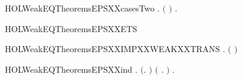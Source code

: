 \newcommand{\HOLWeakEQTheoremsEPSXXcasesOne}{\UseVerbatim{HOLWeakEQTheoremsEPSXXcasesOne}}
\begin{SaveVerbatim}{HOLWeakEQTheoremsEPSXXcasesTwo}
\HOLTokenTurnstile{} \HOLSymConst{\HOLTokenForall{}} .    \HOLSymConst{\HOLTokenEquiv{}} \ensuremath{(} \HOLSymConst{\ensuremath{=}} \ensuremath{)} \HOLSymConst{\HOLTokenDisj{}} \HOLSymConst{\HOLTokenExists{}}.    \HOLSymConst{\HOLTokenConj{}}  \HOLTokenTransBegin\HOLConst{\ensuremath{\tau}}\HOLTokenTransEnd {}
\end{SaveVerbatim}
\newcommand{\HOLWeakEQTheoremsEPSXXcasesTwo}{\UseVerbatim{HOLWeakEQTheoremsEPSXXcasesTwo}}
\begin{SaveVerbatim}{HOLWeakEQTheoremsEPSXXETS}
\HOLTokenTurnstile{}  \HOLSymConst{\ensuremath{=}}   \HOLConst{\ensuremath{\tau}}
\end{SaveVerbatim}
\newcommand{\HOLWeakEQTheoremsEPSXXETS}{\UseVerbatim{HOLWeakEQTheoremsEPSXXETS}}
\begin{SaveVerbatim}{HOLWeakEQTheoremsEPSXXIMPXXWEAKXXTRANS}
\HOLTokenTurnstile{} \HOLSymConst{\HOLTokenForall{}} .    \HOLSymConst{\HOLTokenImp{}} \ensuremath{(} \HOLSymConst{\ensuremath{=}} \ensuremath{)} \HOLSymConst{\HOLTokenDisj{}}  \HOLTokenWeakTransBegin\HOLConst{\ensuremath{\tau}}\HOLTokenWeakTransEnd {}
\end{SaveVerbatim}
\newcommand{\HOLWeakEQTheoremsEPSXXIMPXXWEAKXXTRANS}{\UseVerbatim{HOLWeakEQTheoremsEPSXXIMPXXWEAKXXTRANS}}
\begin{SaveVerbatim}{HOLWeakEQTheoremsEPSXXind}
\HOLTokenTurnstile{} \HOLSymConst{\HOLTokenForall{}}.
       \ensuremath{(}\HOLSymConst{\HOLTokenForall{}}.   \ensuremath{)} \HOLSymConst{\HOLTokenConj{}} \ensuremath{(}\HOLSymConst{\HOLTokenForall{}}  .  \HOLTokenTransBegin\HOLConst{\ensuremath{\tau}}\HOLTokenTransEnd {} \HOLSymConst{\HOLTokenConj{}}    \HOLSymConst{\HOLTokenImp{}}   \ensuremath{)} \HOLSymConst{\HOLTokenImp{}}
       \HOLSymConst{\HOLTokenForall{}} .    \HOLSymConst{\HOLTokenImp{}}   
\end{SaveVerbatim}
